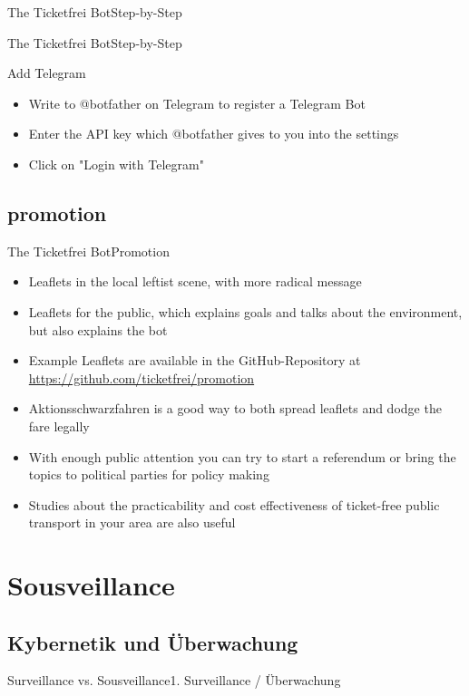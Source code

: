 \documentclass[10pt]{beamer}
\begin{document}
{\begin{frame}{The Ticketfrei Bot}{Step-by-Step}
\end{frame}
\begin{frame}{The Ticketfrei Bot}{Step-by-Step}

\begin{block}{{Add Telegram}}
  \begin{itemize}
    \item Write to @botfather on Telegram to register a Telegram Bot
    \item Enter the API key which @botfather gives to you into the settings
    \item Click on "Login with Telegram"
  \end{itemize}
\end{block}

\end{frame}

\subsection{promotion}
\begin{frame}{The Ticketfrei Bot}{Promotion}

\begin{itemize}
  \item Leaflets in the local leftist scene, with more radical message
  \item Leaflets for the public, which explains goals and talks about the environment, but also explains the bot
  \item Example Leaflets are available in the GitHub-Repository at \url{https://github.com/ticketfrei/promotion}
  \item<2-> Aktionsschwarzfahren is a good way to both spread leaflets and dodge the fare legally
  \item<3-> With enough public attention you can try to start a referendum or bring the topics to political parties for policy making
  \item<4-> Studies about the practicability and cost effectiveness of ticket-free public transport in your area are also useful
\end{itemize}

\end{frame}

\section{Sousveillance}
\subsection{Kybernetik und Überwachung}
\begin{frame}{Surveillance vs. Sousveillance}{1. Surveillance / Überwachung}


\end{frame}}
\end{document}
